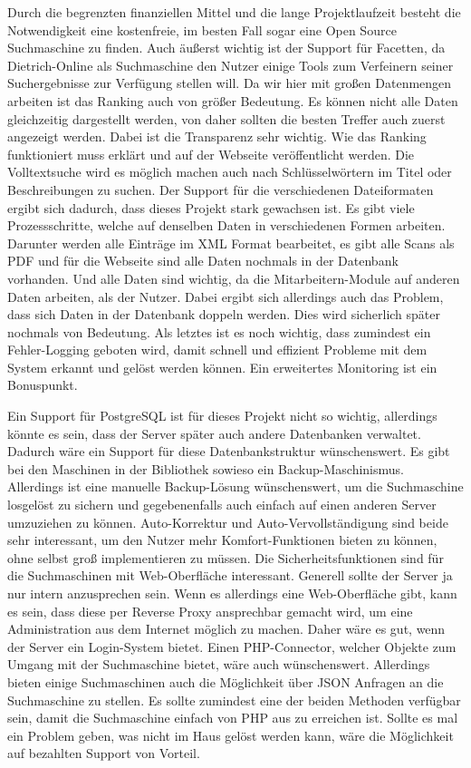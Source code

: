 Durch die begrenzten finanziellen Mittel und die lange Projektlaufzeit besteht die Notwendigkeit eine kostenfreie, im besten Fall sogar eine Open Source Suchmaschine zu finden. Auch äußerst wichtig ist der Support für Facetten, da Dietrich-Online als Suchmaschine den Nutzer einige Tools zum Verfeinern seiner Suchergebnisse zur Verfügung stellen will.
Da wir hier mit großen Datenmengen arbeiten ist das Ranking auch von größer Bedeutung. Es können nicht alle Daten gleichzeitig dargestellt werden, von daher sollten die besten Treffer auch zuerst angezeigt werden. Dabei ist die Transparenz sehr wichtig. Wie das Ranking funktioniert muss erklärt und auf der Webseite veröffentlicht werden.
Die Volltextsuche wird es möglich machen auch nach Schlüsselwörtern im Titel oder Beschreibungen zu suchen.
Der Support für die verschiedenen Dateiformaten ergibt sich dadurch, dass dieses Projekt stark gewachsen ist. Es gibt viele Prozessschritte, welche auf denselben Daten in verschiedenen Formen arbeiten. Darunter werden alle Einträge im XML Format bearbeitet, es gibt alle Scans als PDF und für die Webseite sind alle Daten nochmals in der Datenbank vorhanden. Und alle Daten sind wichtig, da die Mitarbeitern-Module auf anderen Daten arbeiten, als der Nutzer. Dabei ergibt sich allerdings auch das Problem, dass sich Daten in der Datenbank doppeln werden. Dies wird sicherlich später nochmals von Bedeutung.
Als letztes ist es noch wichtig, dass zumindest ein Fehler-Logging geboten wird, damit schnell und effizient Probleme mit dem System erkannt und gelöst werden können. Ein erweitertes Monitoring ist ein Bonuspunkt.

Ein Support für PostgreSQL ist für dieses Projekt nicht so wichtig, allerdings könnte es sein, dass der Server später auch andere Datenbanken verwaltet. Dadurch wäre ein Support für diese Datenbankstruktur wünschenswert.
Es gibt bei den Maschinen in der Bibliothek sowieso ein Backup-Maschinismus. Allerdings ist eine manuelle Backup-Lösung wünschenswert, um die Suchmaschine losgelöst zu sichern und gegebenenfalls auch einfach auf einen anderen Server umzuziehen zu können. 
Auto-Korrektur und Auto-Vervollständigung sind beide sehr interessant, um den Nutzer mehr Komfort-Funktionen bieten zu können, ohne selbst groß implementieren zu müssen. 
Die Sicherheitsfunktionen sind für die Suchmaschinen mit Web-Oberfläche interessant. Generell sollte der Server ja nur intern anzusprechen sein. Wenn es allerdings eine Web-Oberfläche gibt, kann es sein, dass diese per Reverse Proxy ansprechbar gemacht wird, um eine Administration aus dem Internet möglich zu machen. Daher wäre es gut, wenn der Server ein Login-System bietet.
Einen PHP-Connector, welcher Objekte zum Umgang mit der Suchmaschine bietet, wäre auch wünschenswert. Allerdings bieten einige Suchmaschinen auch die Möglichkeit über JSON Anfragen an die Suchmaschine zu stellen. Es sollte zumindest eine der beiden Methoden verfügbar sein, damit die Suchmaschine einfach von PHP aus zu erreichen ist.
Sollte es mal ein Problem geben, was nicht im Haus gelöst werden kann, wäre die Möglichkeit auf bezahlten Support von Vorteil.

